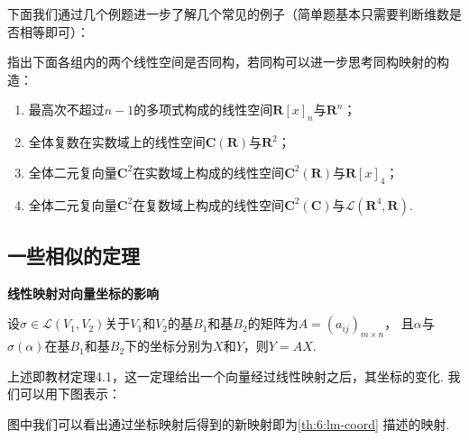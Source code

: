 下面我们通过几个例题进一步了解几个常见的例子（简单题基本只需要判断维数是否相等即可）：
\begin{example}
    指出下面各组内的两个线性空间是否同构，若同构可以进一步思考同构映射的构造：
    \begin{enumerate}
        \item 最高次不超过$n-1$的多项式构成的线性空间$\mathbf{R}[x]_n$与$\mathbf{R}^n$；

        \item 全体复数在实数域上的线性空间$\mathbf{C}(\mathbf{R})$与$\mathbf{R}^2$；

        \item 全体二元复向量$\mathbf{C}^2$在实数域上构成的线性空间$\mathbf{C}^2(\mathbf{R})$与$\mathbf{R}[x]_4$；

        \item 全体二元复向量$\mathbf{C}^2$在复数域上构成的线性空间$\mathbf{C}^2(\mathbf{C})$与$\mathcal{L}(\mathbf{R}^4,\mathbf{R})$.
    \end{enumerate}
\end{example}

\subsection{一些相似的定理}
\begin{theorem} \label{th:6:lm-coord}
    \textbf{\heiti 线性映射对向量坐标的影响}

    设$\sigma \in \mathcal{L}(V_1,V_2)$关于$V_1$和$V_2$的基$B_1$和基$B_2$的矩阵为$A=(a_{ij})_{m \times n}$，
    且$\alpha$与$\sigma(\alpha)$在基$B_1$和基$B_2$下的坐标分别为$X$和$Y$，则$Y=AX$.
\end{theorem}
上述即教材定理4.1，这一定理给出一个向量经过线性映射之后，其坐标的变化. 我们可以用下图表示：

\begin{figure}[h]
    \centering
\end{figure}

图中我们可以看出通过坐标映射后得到的新映射即为\autoref{th:6:lm-coord} 描述的映射.

